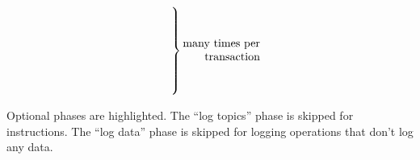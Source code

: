 \begin{table}[h]
\[		\quad
		\setlength{\arraycolsep}{0pt} %
		\begin{array}{ c }
			\vphantom{a_N} \\ %
			\vphantom{a_N} \\ %
			\left.\kern-\nulldelimiterspace
			\vphantom{\begin{array}{ c }
				\text{Hello}  \\ %
				\vdots \\ %
				\vdots \\ %
				\vdots \\ %
				\text{Hello}  \\ %
			\end{array}} \right\}
			\begin{array}{r}
				\text{many times per} \\
				\text{transaction} \\
			\end{array}
		\end{array}
	\]
	\caption{
	Optional phases are \colorbox{solarized-green}{highlighted}. The ``log topics'' phase is skipped for  instructions. The ``log data'' phase is skipped for logging operations that don't log any data.}
	\label{fig: phase 4 subphase table}
\end{table}
